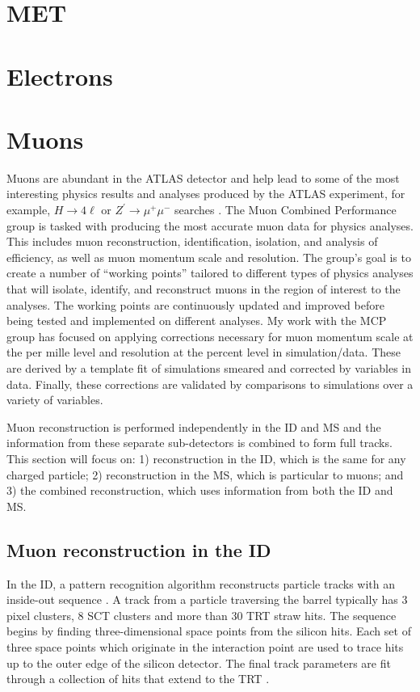 \section{MET}
\section{Electrons}
\section{Muons}
Muons are abundant in the ATLAS detector and help lead to some of the most interesting physics results and analyses produced by the ATLAS experiment, for example, $H \rightarrow 4\ell$ or $Z^\prime \rightarrow \mu^+\mu^-$ searches \cite{4l}. The Muon Combined Performance group is tasked with producing the most accurate muon data for physics analyses. This includes muon reconstruction, identification, isolation, and analysis of efficiency, as well as muon momentum scale and resolution. The group's goal is to create a number of ``working points'' tailored to different types of physics analyses that will isolate, identify, and reconstruct muons in the region of interest to the analyses. The working points are continuously updated and improved before being tested and implemented on different analyses. My work with the MCP group has focused on applying corrections necessary for muon momentum scale at the per mille level and resolution at the percent level in simulation/data. These are derived by a template fit of simulations smeared and corrected by variables in data. Finally, these corrections are validated by comparisons to simulations over a variety of variables. 

Muon reconstruction is performed independently in the ID and MS and the information from these separate sub-detectors is combined to form full tracks. This section will focus on: 1) reconstruction in the ID, which is the same for any charged particle; 2) reconstruction in the MS, which is particular to muons; and 3) the combined reconstruction, which uses information from both the ID and MS. 

\subsection{Muon reconstruction in the ID}
In the ID, a pattern recognition algorithm reconstructs particle tracks with an inside-out sequence \cite{patternrecognition}. A track from a particle traversing the barrel typically has 3 pixel clusters, 8 SCT clusters and more than 30 TRT straw hits. The sequence begins by finding three-dimensional space points from the silicon hits. Each set of three space points which originate in the  interaction point are used to trace hits up to the outer edge of the silicon detector. The final track parameters are fit through a collection of hits that extend to the TRT \cite{IDreconstruction}.

